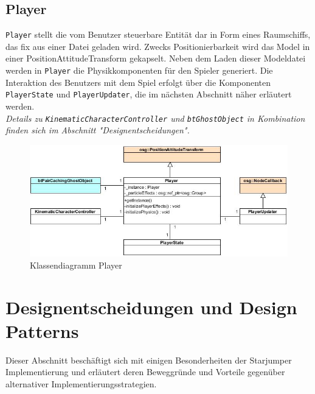 \documentclass{llncs}
\begin{document}
\subsection{Player}
\texttt{Player} stellt die vom Benutzer steuerbare Entit\"at dar in Form eines Raumschiffs, das fix aus einer Datei
geladen wird. Zwecks Positionierbarkeit wird das Model in einer PositionAttitudeTransform gekapselt.
Neben dem Laden dieser Modeldatei werden in \texttt{Player} die Physikkomponenten f\"ur den Spieler generiert.
Die Interaktion des Benutzers mit dem Spiel erfolgt \"uber die Komponenten \texttt{PlayerState} und \texttt{PlayerUpdater},
die im n\"achsten Abschnitt n\"aher erl\"autert werden.\\
\textit{Details zu \texttt{KinematicCharacterController} und \texttt{btGhostObject} in Kombination finden sich im Abschnitt "Designentscheidungen".}

\begin{figure}[H]
	\centering
	\includegraphics[width=1\textwidth]{Player.jpg}
	\caption{Klassendiagramm Player}
\end{figure}

\section{Designentscheidungen und Design Patterns}
Dieser Abschnitt besch\"aftigt sich mit einigen Besonderheiten der Starjumper Implementierung und erl\"autert deren
Beweggr\"unde und Vorteile gegen\"uber alternativer Implementierungsstrategien.
\end{document}
